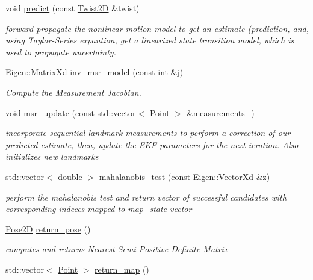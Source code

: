 \begin{DoxyCompactItemize}
void \hyperlink{classnuslam_1_1EKF_ad6eddda5abffd650b98ce947263d0ea8}{predict} (const \hyperlink{classrigid2d_1_1Twist2D}{Twist2D} \&twist)
\begin{DoxyCompactList}\small\item\em forward-\/propagate the nonlinear motion model to get an estimate (prediction, and, using Taylor-\/\+Series expantion, get a linearized state transition model, which is used to propagate uncertainty. \end{DoxyCompactList}\item 
Eigen\+::\+Matrix\+Xd \hyperlink{classnuslam_1_1EKF_a51b063065f405856d85fe048d736c68a}{inv\+\_\+msr\+\_\+model} (const int \&j)
\begin{DoxyCompactList}\small\item\em Compute the Measurement Jacobian. \end{DoxyCompactList}\item 
void \hyperlink{classnuslam_1_1EKF_aa45c8b3af13b612d8517ad0716166ed6}{msr\+\_\+update} (const std\+::vector$<$ \hyperlink{structnuslam_1_1Point}{Point} $>$ \&measurements\+\_\+)
\begin{DoxyCompactList}\small\item\em incorporate sequential landmark measurements to perform a correction of our predicted estimate, then, update the \hyperlink{classnuslam_1_1EKF}{E\+KF} parameters for the next ieration. Also initializes new landmarks \end{DoxyCompactList}\item 
std\+::vector$<$ double $>$ \hyperlink{classnuslam_1_1EKF_a6cf0259a033ba671961ea06d1737ee3c}{mahalanobis\+\_\+test} (const Eigen\+::\+Vector\+Xd \&z)
\begin{DoxyCompactList}\small\item\em perform the mahalanobis test and return vector of successful candidates with corresponding indeces mapped to map\+\_\+state vector \end{DoxyCompactList}\item 
\hyperlink{structrigid2d_1_1Pose2D}{Pose2D} \hyperlink{classnuslam_1_1EKF_a5292c5dd543b8d58edf51f7addfd7e09}{return\+\_\+pose} ()
\begin{DoxyCompactList}\small\item\em computes and returns Nearest Semi-\/\+Positive Definite Matrix \end{DoxyCompactList}\item 
std\+::vector$<$ \hyperlink{structnuslam_1_1Point}{Point} $>$ \hyperlink{classnuslam_1_1EKF_a9f461c60e11f23e99e04caeb76c9decc}{return\+\_\+map} ()

\end{DoxyCompactItemize}
